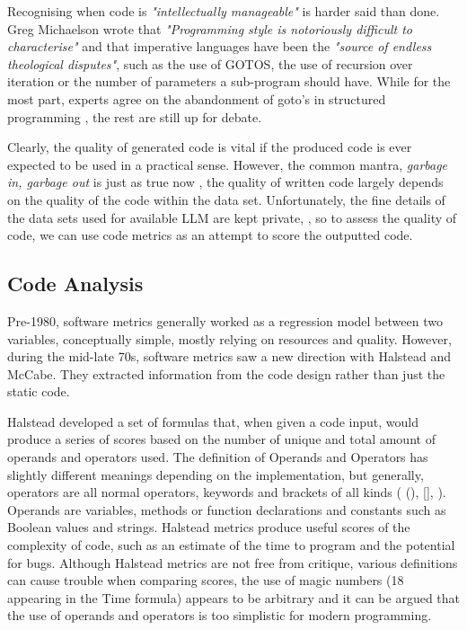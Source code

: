 \documentclass[manuscript,screen,review,sigconf]{acmart}
\begin{document}
Recognising when code is \textit{"intellectually manageable"} is harder said than done. Greg Michaelson wrote that \textit{"Programming style is notoriously difficult to characterise"} and that imperative languages have been the \textit{"source of endless theological disputes"}, such as the use of GOTOS, the use of recursion over iteration or the number of parameters a sub-program should have\cite{Automatic_analysis}. While for the most part, experts agree on the abandonment of goto's in structured programming \cite{gotoConsideredHarmful, KnuthGoTo}, the rest are still up for debate.

Clearly, the quality of generated code is vital if the produced code is ever expected to be used in a practical sense. However, the common mantra, \textit{garbage in, garbage out} is just as true now \cite{simmons2023garbage}, the quality of written code largely depends on the quality of the code within the data set. Unfortunately,  the fine details of the data sets used for available LLM are kept private, \cite{SysEvaOfLLMofCode}, so to assess the quality of code, we can use code metrics as an attempt to score the outputted code.


\subsection{Code Analysis}
Pre-1980, software metrics generally worked as a regression model between two variables, conceptually simple, mostly relying on resources and quality. However, during the mid-late 70s, software metrics saw a new direction with Halstead and McCabe\cite{FENTON1999149}. They extracted information from the code design rather than just the static code.

Halstead developed a set of formulas that, when given a code input, would produce a series of scores based on the number of unique and total amount of operands and operators used\cite{Halstead}. The definition of Operands and Operators has slightly different meanings depending on the implementation, but generally, operators are all normal operators, keywords and brackets of all kinds ( (), [], {} ). Operands are variables, methods or function declarations and constants such as Boolean values and strings. Halstead metrics produce useful scores of the complexity of code, such as an estimate of the time to program and the potential for bugs. Although Halstead metrics are not free from critique, various definitions can cause trouble when comparing scores, the use of magic numbers (18 appearing in the Time formula) appears to be arbitrary and it can be argued that the use of operands and operators is too simplistic for modern programming.
\end{document}
